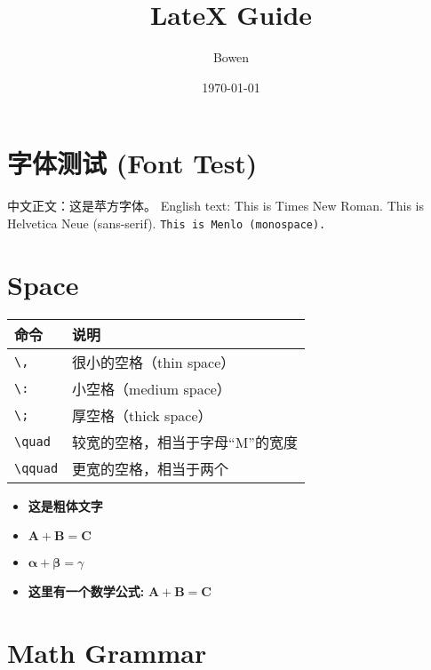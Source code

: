 \documentclass[a4paper,12pt]{article}
\begin{document}
    \title{LateX Guide}
    \author{Bowen}
    \date{\today}
    \maketitle
    \section*{字体测试 (Font Test)}
    中文正文：这是苹方字体。
    English text: This is Times New Roman.
    \textsf{This is Helvetica Neue (sans-serif).}
    \texttt{This is Menlo (monospace).}



    \section{Space}

    \begin{tabular}{ll}
        \toprule
        \textbf{命令}   & \textbf{说明}       \\
        \midrule
        \verb|\,|     & 很小的空格（thin space） \\
        \verb|\:|     & 小空格（medium space） \\
        \verb|\;|     & 厚空格（thick space）  \\
        \verb|\quad|  & 较宽的空格，相当于字母“M”的宽度 \\
        \verb|\qquad| & 更宽的空格，相当于两个 \quad \\
    \end{tabular}


    \begin{itemize}
        \item \textbf{这是粗体文字}
        \item $\mathbf{A} + \mathbf{B} = \mathbf{C}$
        \item $\bm{\alpha + \beta} = \gamma$
        \item \textbf{这里有一个数学公式: } $\mathbf{A + B = C}$
    \end{itemize}



    \section{Math Grammar}
\end{document}
